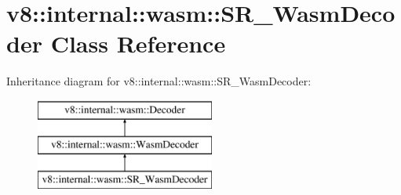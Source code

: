 \hypertarget{classv8_1_1internal_1_1wasm_1_1_s_r___wasm_decoder}{}\section{v8\+:\+:internal\+:\+:wasm\+:\+:S\+R\+\_\+\+Wasm\+Decoder Class Reference}
\label{classv8_1_1internal_1_1wasm_1_1_s_r___wasm_decoder}
Inheritance diagram for v8\+:\+:internal\+:\+:wasm\+:\+:S\+R\+\_\+\+Wasm\+Decoder\+:\begin{figure}[H]
\begin{center}
\leavevmode
\includegraphics[height=3.000000cm]{classv8_1_1internal_1_1wasm_1_1_s_r___wasm_decoder}
\end{center}
\end{figure}
